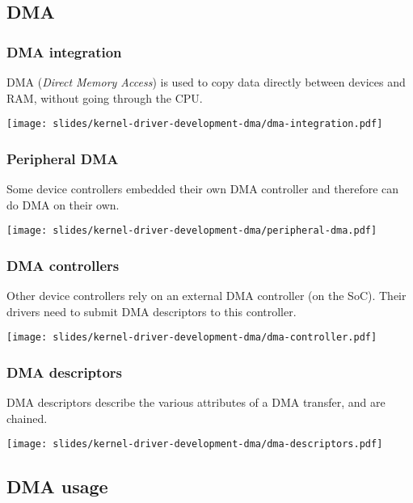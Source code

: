 \subsection{DMA}

\begin{frame}
  \frametitle{DMA integration}
  DMA ({\em Direct Memory Access}) is used to copy data directly between
  devices and RAM, without going through the CPU.
  \begin{center}
    \texttt{[image: slides/kernel-driver-development-dma/dma-integration.pdf]}
  \end{center}
\end{frame}

\begin{frame}
  \frametitle{Peripheral DMA}
  Some device controllers embedded their own DMA controller
  and therefore can do DMA on their own.
  \begin{center}
    \texttt{[image: slides/kernel-driver-development-dma/peripheral-dma.pdf]}
  \end{center}
\end{frame}

\begin{frame}
  \frametitle{DMA controllers}
  Other device controllers rely on an external DMA controller (on the
  SoC). Their drivers need to submit DMA descriptors to this controller.
  \begin{center}
    \texttt{[image: slides/kernel-driver-development-dma/dma-controller.pdf]}
  \end{center}
\end{frame}

\begin{frame}
  \frametitle{DMA descriptors}
  DMA descriptors describe the various attributes of a DMA transfer, and are chained.
  \begin{center}
    \texttt{[image: slides/kernel-driver-development-dma/dma-descriptors.pdf]}
  \end{center}
\end{frame}

\subsection{DMA usage}

